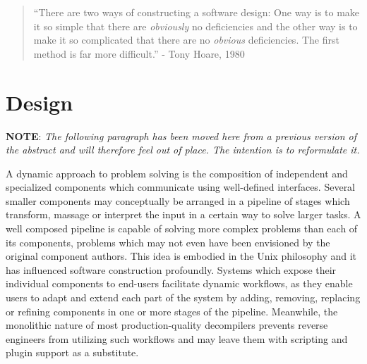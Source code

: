 
%

\begin{quote}
	``There are two ways of constructing a software design: One way is to make it so simple that there are \textit{obviously} no deficiencies and the other way is to make it so complicated that there are no \textit{obvious} deficiencies. The first method is far more difficult.'' - Tony Hoare, 1980 \cite{hoare_acm_lecture}
\end{quote}

\section{Design}
\label{sec:design}







\textbf{NOTE}: \textit{The following paragraph has been moved here from a previous version of the abstract and will therefore feel out of place. The intention is to reformulate it.}


A dynamic approach to problem solving is the composition of independent and specialized components which communicate using well-defined interfaces. Several smaller components may conceptually be arranged in a pipeline of stages which transform, massage or interpret the input in a certain way to solve larger tasks. A well composed pipeline is capable of solving more complex problems than each of its components, problems which may not even have been envisioned by the original component authors. This idea is embodied in the Unix philosophy and it has influenced software construction profoundly. Systems which expose their individual components to end-users facilitate dynamic workflows, as they enable users to adapt and extend each part of the system by adding, removing, replacing or refining components in one or more stages of the pipeline. Meanwhile, the monolithic nature of most production-quality decompilers prevents reverse engineers from utilizing such workflows and may leave them with scripting and plugin support as a substitute.

